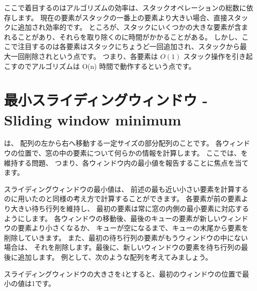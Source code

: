 ここで着目するのはアルゴリズムの効率は、スタックオペレーションの総数に依存します。
現在の要素がスタックの一番上の要素より大きい場合、直接スタックに追加され効率的です。
ところが、スタックにいくつかの大きな要素が含まれることがあり、それらを取り除くのに時間がかかることがある。
しかし、ここで注目するのは各要素はスタックにちょうど一回追加され、スタックから最大一回削除されという点です。
つまり、各要素は $O(1)$ スタック操作を引き起こすのでアルゴリズムは O(n) 時間で動作するという点です。

\section{最小スライディングウィンドウ - Sliding window minimum}


は、
配列の左から右へ移動する一定サイズの部分配列のことです。
各ウィンドウの位置で、窓の中の要素について何らかの情報を計算します。
ここでは、を維持する問題、
つまり、各ウィンドウ内の最小値を報告することに焦点を当てます。

スライディングウィンドウの最小値は、
前述の最も近い小さい要素を計算するのに用いたのと同様の考え方で計算することができます。
各要素が前の要素より大きい待ち行列を維持し、
最初の要素は常に窓の内側の最小要素に対応するようにします。
各ウィンドウの移動後、最後のキューの要素が新しいウィンドウの要素より小さくなるか、
キューが空になるまで、キューの末尾から要素を削除していきます。
また、最初の待ち行列の要素がもうウィンドウの中にない場合は、
それを削除します。最後に、新しいウィンドウの要素を待ち行列の最後に追加します。
例として、次のような配列を考えてみましょう。

\begin{center}
\end{center}

スライディングウィンドウの大きさを4とすると、最初のウィンドウの位置で最小の値は1です。

